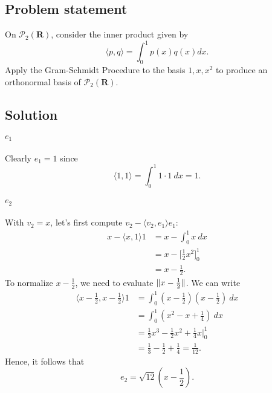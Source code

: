 \documentclass{article}
\begin{document}
\subsection*{Problem statement}
On $\mathcal{P}_2(\mathbf{R})$, consider the inner product given by
\[\langle p,q\rangle=\int_0^1 p(x)q(x)dx.\]
Apply the Gram-Schmidt Procedure to the basis $1,x,x^2$ to produce an orthonormal basis of $\mathcal{P}_2(\mathbf{R})$.

\subsection*{Solution}
\paragraph{$e_1$}
Clearly $e_1=1$ since 
\[\langle 1,1\rangle=\int_0^1 1\cdot 1\ dx=1.\]

\paragraph{$e_2$}
With $v_2=x$,  let's first compute $v_2-\langle v_2,e_1\rangle e_1$:
\begin{align*}
    x-\langle x,1\rangle1&=x-\int_0^1x\ dx\\
    &=x -\Big[\frac{1}{2}x^2 \Big]_0^1\\
    &=x-\frac{1}{2}.
\end{align*}
To normalize $x-\frac{1}{2}$, we need to evaluate $\lVert x-\frac{1}{2}\rVert$. 
We can write
\begin{align*}
    \langle x-\frac{1}{2},x-\frac{1}{2}\rangle1&=\int_0^1(x-\frac{1}{2})(x-\frac{1}{2})\ dx\\
    &= \int_0^1(x^2-x+\frac{1}{4})\ dx\\
    &=\frac{1}{3}x^3-\frac{1}{2}x^2+\frac{1}{4}x\Big|_0^1\\
    &=\frac{1}{3}-\frac{1}{2}+\frac{1}{4}=\frac{1}{12}.
\end{align*}
Hence, it follows that
\[e_2=\sqrt{12}(x-\frac{1}{2}).\]
\end{document}
